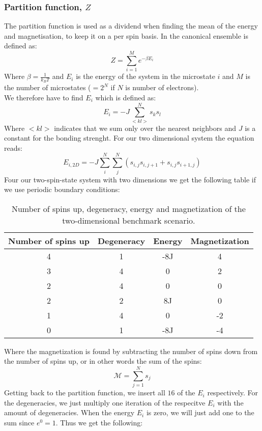 \documentclass[../main.tex]{subfiles}
\begin{document}
\subsubsection*{Partition function, $Z$}
The partition function is used as a dividend when finding the mean of the energy and magnetisation, to keep it on a per spin basis. In the canonical ensemble is defined as:
\[ Z = \sum_{i=1}^M e^{-\beta E_i}\]
Where $\beta =\frac{1}{k_B T}$ and $E_i$ is the energy of the system in the microstate $i$ and $M$ is the number of microstates ($=2^N$ if $N$ is number of electrons).
\\
We therefore have to find $E_i$ which is defined as:
\[E_i = -J \sum_{<kl>}^N s_k s_l\]
Where $<kl>$ indicates that we sum only over the nearest neighbors and $J$ is a constant for the bonding strenght. For our two dimensional system the equation reads:
\[E_{i,2D} = -J \sum_i^N \sum_j^N \left(s_{i,j}s_{i,j+1} + s_{i,j}s_{i+1,j}\right)\]
Four our two-spin-state system with two dimensions we get the following table if we use periodic boundary conditions:
\begin{table}[!h]
  \begin{center}
    \begin{tabular}{| c | c | c | c |}
      \hline
      Number of spins up & Degeneracy & Energy & Magnetization\\
      \hline
      4 & 1 & -8J & 4\\
      3 & 4 & 0 & 2 \\
      2 & 4 & 0 & 0\\
      2 & 2 & 8J & 0 \\
      1 & 4 & 0 & -2 \\
      0 & 1 & -8J & -4 \\
      \hline
    \end{tabular}
    \caption{Number of spins up, degeneracy, energy and magnetization of the two-dimensional benchmark scenario.}
    \label{tab:2x2spinsEnergiesMags}
  \end{center}
\end{table}
\FloatBarrier
Where the magnetization is found by subtracting the number of spins down from the number of spins up, or in other words the sum of the spins:
\[\mathcal{M} = \sum_{j=1}^N s_j\]
Getting back to the partition function, we insert all $16$ of the $E_i$ respectively. For the degeneracies, we just multiply one iteration of the respecitve $E_i$ with the amount of degeneracies. When the energy $E_i$ is zero, we will just add one to the sum since $e^0 = 1$. Thus we get the following:
\end{document}
